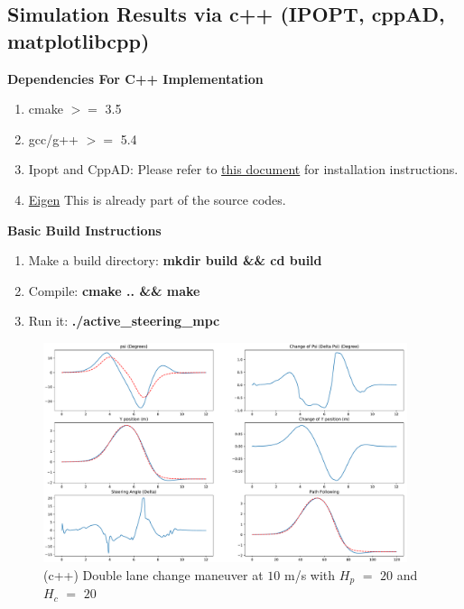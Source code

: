 \documentclass[12pt]{article}
\begin{document}
\subsection{Simulation Results via c++ (IPOPT, cppAD, matplotlibcpp)}
\textbf{Dependencies For C++ Implementation}
\begin{enumerate}
	\item cmake $>=$ 3.5
	\item gcc/g++ $>=$ 5.4
	\item Ipopt and CppAD: Please refer to \href{https://github.com/udacity/CarND-MPC-Project/blob/master/install_Ipopt_CppAD.md}{this document} for installation instructions.
	\item \href{http://eigen.tuxfamily.org/index.php?title=Main_Page}{Eigen} This is already part of the source codes.
\end{enumerate}
\textbf{Basic Build Instructions}
\begin{enumerate}
	\item Make a build directory: \textbf{mkdir build \&\& cd build}
	\item Compile: \textbf{cmake .. \&\& make}
	\item Run it: \textbf{./active\_steering\_mpc}
\end{enumerate}
\begin{figure}[!ht]
	\centering
	\includegraphics[width=0.95\textwidth,keepaspectratio]{images/Double_Lane_Change_Maneuver_cpp_01.pdf}
	\caption{(c++) Double lane change maneuver at $10$ m/s with $H_p$ $=$ $20$ and $H_c$ $=$ $20$}
	\label{fig_10:double_lane_change_maneuver_cpp_01}
\end{figure}
\end{document}

